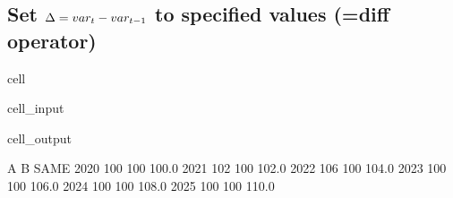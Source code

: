 \documentclass[letterpaper,10pt,english]{jupyterBook}
\begin{document}
\subsection{Set \protect\(\Delta = var_t - var_{t-1}\protect\) to specified values (=diff operator)}
\label{\detokenize{content/04_PythonEssentials/UpdateCommand:set-delta-var-t-var-t-1-to-specified-values-diff-operator}}
\begin{sphinxuseclass}{cell}\begin{sphinxVerbatimInput}

\begin{sphinxuseclass}{cell_input}
\begin{sphinxVerbatim}[commandchars=\\\{\}]

\end{sphinxVerbatim}

\end{sphinxuseclass}\end{sphinxVerbatimInput}
\begin{sphinxVerbatimOutput}

\begin{sphinxuseclass}{cell_output}
\begin{sphinxVerbatim}[commandchars=\\\{\}]
        A    B   SAME
2020  100  100  100.0
2021  102  100  102.0
2022  106  100  104.0
2023  100  100  106.0
2024  100  100  108.0
2025  100  100  110.0
\end{sphinxVerbatim}

\end{sphinxuseclass}\end{sphinxVerbatimOutput}

\end{sphinxuseclass}
\end{document}
